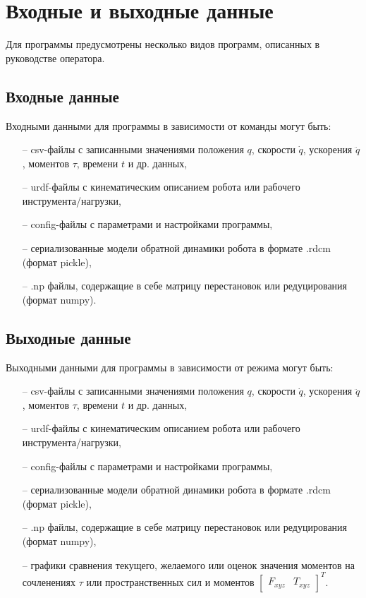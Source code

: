 \newpage
\section{Входные и выходные данные}
Для программы предусмотрены несколько видов программ, описанных в руководстве оператора.

\subsection{Входные данные}
Входными данными для программы в зависимости от команды могут быть:
\begin{enumerate}
    \item [--] csv-файлы с записанными значениями положения $q$, скорости $\dot{q}$, ускорения $\ddot{q}$, моментов $\tau$, времени $t$ и др. данных,
	\item [--] urdf-файлы с кинематическим описанием робота или рабочего инструмента/нагрузки,
	\item [--] config-файлы с параметрами и настройками программы,
    \item [--] сериализованные модели обратной динамики робота в формате {.rdcm} (формат pickle),
    \item [--] {.np} файлы, содержащие в себе матрицу перестановок или редуцирования (формат numpy).
\end{enumerate}

\subsection{Выходные данные}
Выходными данными для программы в зависимости от режима могут быть:
\begin{enumerate}
    \item [--] csv-файлы с записанными значениями положения $q$, скорости $\dot{q}$, ускорения $\ddot{q}$, моментов $\tau$, времени $t$ и др. данных,
	\item [--] urdf-файлы с кинематическим описанием робота или рабочего инструмента/нагрузки,
	\item [--] config-файлы с параметрами и настройками программы,
    \item [--] сериализованные модели обратной динамики робота в формате {.rdcm} (формат pickle),
    \item [--] {.np} файлы, содержащие в себе матрицу перестановок или редуцирования (формат numpy),
    \item [--] графики сравнения текущего, желаемого или оценок значения моментов на сочленениях $\tau$ или пространственных сил и моментов $\begin{bmatrix} F_{xyz} & T_{xyz}\end{bmatrix}^T$.
\end{enumerate}